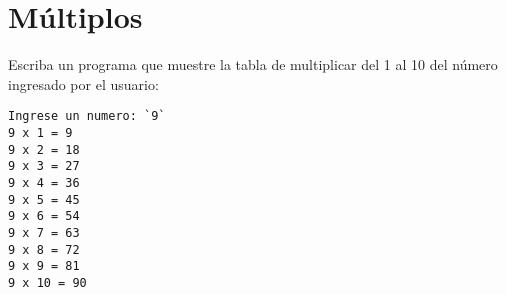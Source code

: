 \section{Múltiplos}

Escriba un programa que muestre la tabla de multiplicar del 1 al 10 del
número ingresado por el usuario:

\begin{lstlisting}[language=testcase]
Ingrese un numero: `9`
9 x 1 = 9
9 x 2 = 18
9 x 3 = 27
9 x 4 = 36
9 x 5 = 45
9 x 6 = 54
9 x 7 = 63
9 x 8 = 72
9 x 9 = 81
9 x 10 = 90
\end{lstlisting}
